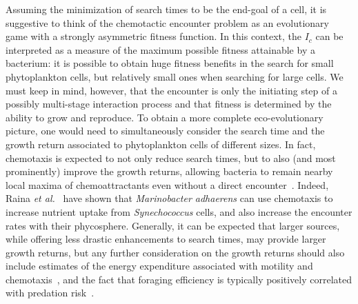 \documentclass[9pt,twocolumn,twoside]{pnas-new}
\begin{document}
Assuming the minimization of search times to be the end-goal of a cell, it is suggestive to think of the chemotactic encounter problem as an evolutionary game with a strongly asymmetric fitness function.
In this context, the $I_c$ can be interpreted as a measure of the maximum possible fitness attainable by a bacterium: it is possible to obtain huge fitness benefits in the search for small phytoplankton cells, but relatively small ones when searching for large cells. 
We must keep in mind, however, that the encounter is only the initiating step of a possibly multi-stage interaction process and that fitness is determined by the ability to grow and reproduce.
To obtain a more complete eco-evolutionary picture, one would need to simultaneously consider the search time and the growth return associated to phytoplankton cells of different sizes.
In fact, chemotaxis is expected to not only reduce search times, but to also (and most prominently) improve the growth returns, allowing bacteria to remain nearby local maxima of chemoattractants even without a direct encounter~\cite{fernandez2019foraging}.
Indeed, Raina \textit{et al.}~\cite{raina2023chemotaxis} have shown that \textit{Marinobacter adhaerens} can use chemotaxis to increase nutrient uptake from \textit{Synechococcus} cells, and also increase the encounter rates with their phycosphere.
Generally, it can be expected that larger sources, while offering less drastic enhancements to search times, may provide larger growth returns, but any further consideration on the growth returns should also include estimates of the energy expenditure associated with motility and chemotaxis~\cite{malaguti2021theory,keegstra2022ecological}, and the fact that foraging efficiency is typically positively correlated with predation risk~\cite{nielsen2021foraging,ebrahimi2022particle}.
\end{document}
